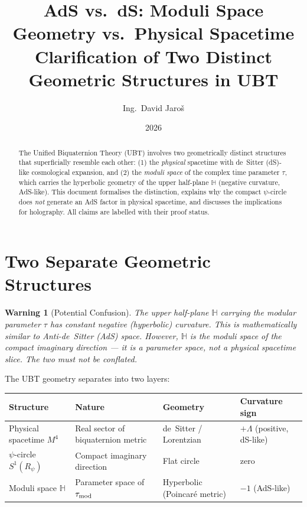 \documentclass[11pt,a4paper]{article}
\title{AdS vs.\ dS: Moduli Space Geometry vs.\ Physical Spacetime\\
\large Clarification of Two Distinct Geometric Structures in UBT}
\author{Ing.\ David Jaroš}
\date{2026}
\newtheorem{warning}{Warning}
\begin{document}
\maketitle

\begin{abstract}
The Unified Biquaternion Theory (UBT) involves two geometrically distinct structures
that superficially resemble each other: (1) the \emph{physical} spacetime with
de~Sitter (dS)-like cosmological expansion, and (2) the \emph{moduli space} of the
complex time parameter $\tau$, which carries the hyperbolic geometry of the upper
half-plane $\mathbb{H}$ (negative curvature, AdS-like). This document formalises
the distinction, explains why the compact $\psi$-circle does \emph{not} generate
an AdS factor in physical spacetime, and discusses the implications for holography.
All claims are labelled with their proof status.
\end{abstract}

\section{Two Separate Geometric Structures}
\label{sec:two_structures}

\begin{warning}[Potential Confusion]
The upper half-plane $\mathbb{H}$ carrying the modular parameter $\tau$ has
constant negative (hyperbolic) curvature. This is \emph{mathematically similar}
to Anti-de~Sitter (AdS) space. However, $\mathbb{H}$ is the \emph{moduli space}
of the compact imaginary direction — it is a parameter space, not a physical
spacetime slice. The two must not be conflated.
\end{warning}

The UBT geometry separates into two layers:

\begin{center}
\begin{tabular}{|l|l|l|l|}
\hline
\textbf{Structure} & \textbf{Nature} & \textbf{Geometry} & \textbf{Curvature sign} \\
\hline
Physical spacetime $M^4$ & Real sector of biquaternion metric & de~Sitter / Lorentzian & $+\Lambda$ (positive, dS-like) \\
$\psi$-circle $S^1(R_\psi)$ & Compact imaginary direction & Flat circle & zero \\
Moduli space $\mathbb{H}$ & Parameter space of $\tau_{\rm mod}$ & Hyperbolic (Poincaré metric) & $-1$ (AdS-like) \\
\hline
\end{tabular}
\end{center}
\end{document}
